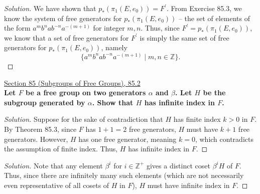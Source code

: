 \documentclass[11pt]{article}
\newcommand{\Z}{\mathbb{Z}}
\newenvironment{solution}
  {\renewcommand\qedsymbol{$\blacksquare$}\begin{proof}[Solution]}
  {\end{proof}}
\begin{document}
\begin{solution}
We have shown that $p_{\ast}(\pi_1(E, e_0)) = F^{\prime}$. From Exercise 85.3, we know the system of free generators for $p_{\ast}(\pi_1(E, e_0))$ --
the set of elements of the form $a^m b^n a b^{-n} a^{-(m+1)}$ for integer $m, n$. Thus, since $F^{\prime} = p_{\ast}(\pi_1(E, e_0))$, we know
that a set of free generators for $F^{\prime}$ is simply the same set of free generators for $p_{\ast}(\pi_1(E, e_0))$, namely
\[
    \boxed{\{ a^m b^n a b^{-n} a^{-(m+1)} \mid m, n \in \Z\}}.
\]
\end{solution}

\newpage

\underline{Section 85 (Subgroups of Free Groups), 85.2} \\

\textbf{Let $F$ be a free group on two generators $\alpha$ and $\beta$. Let $H$ be the subgroup generated by $\alpha$. Show that $H$ has infinite index in $F$.}

\begin{solution}
Suppose for the sake of contradiction that $H$ has finite index $k > 0$ in $F$. By Theorem 85.3, since $F$ has $1 + 1 = 2$ free generators, 
$H$ must have $k + 1$ free generators. However, $H$ has one free generator, meaning $k = 0$, which contradicts the assumption of finite index. 
Thus, $H$ has infinite index in $F$.
\end{solution}

\begin{solution}
Note that any element $\beta^i$ for $i \in \Z^+$ gives a distinct coset $\beta^i H$ of $F$. Thus, since there are infinitely
many such elements (which are not necessarily even representative of all cosets of $H$ in $F$), $H$ must have infinite index in $F$.
\end{solution}
\end{document}
